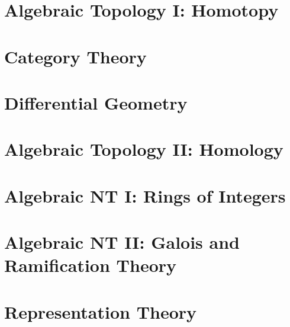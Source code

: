 \documentclass[11pt,numbers=noenddot]{scrreprt}
\begin{document}
\part{Algebraic Topology I: Homotopy}
 


\part{Category Theory}


\part{Differential Geometry}



\part{Algebraic Topology II: Homology}





\part{Algebraic NT I: Rings of Integers}





\part{Algebraic NT II: Galois and Ramification Theory}





\part{Representation Theory}




\end{document}
